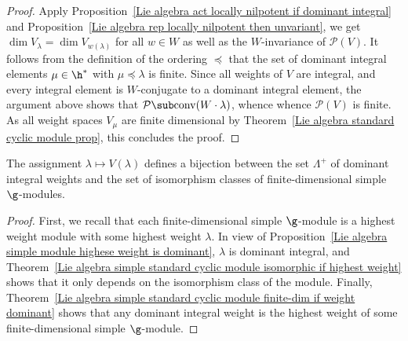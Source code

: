 \begin{proof}
Apply Proposition~\ref{Lie algebra act locally nilpotent if dominant integral} and Proposition~\ref{Lie algebra rep locally nilpotent then unvariant}, we get $\dim V_{\lambda}=\dim V_{w(\lambda)}$ for all $w\in W$ as well as the $W$-invariance of $\mathcal{P}(V)$. It follows from the definition of the ordering $\preceq$ that the set of dominant integral elements $\mu\in\h^*$ with $\mu\preceq\lambda$ is finite. Since all weights of $V$ are integral, and every integral element is $W$-conjugate to a dominant integral element, the argument above shows that $\mathcal{P}\sub\mathrm{conv}(W\cdot\lambda)$, whence whence $\mathcal{P}(V)$ is finite. As all weight spaces $V_\mu$ are finite dimensional by Theorem~\ref{Lie algebra standard cyclic module prop}, this concludes the proof.
\end{proof}
\begin{theorem}
The assignment $\lambda\mapsto V(\lambda)$ defines a bijection between the set $\Lambda^+$ of dominant integral weights and the set of isomorphism classes of finite-dimensional simple $\g$-modules.
\end{theorem}
\begin{proof}
First, we recall that each finite-dimensional simple $\g$-module is a highest weight module with some highest weight $\lambda$. In view of Proposition~\ref{Lie algebra simple module highese weight is dominant}, $\lambda$ is dominant integral, and Theorem~\ref{Lie algebra simple standard cyclic module isomorphic if highest weight} shows that it only depends on the isomorphism class of the module. Finally, Theorem~\ref{Lie algebra simple standard cyclic module finite-dim if weight dominant} shows that any dominant integral weight is the highest weight of some finite-dimensional simple $\g$-module.
\end{proof}
